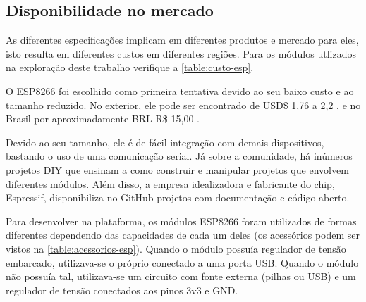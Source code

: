 \FloatBarrier
\subsection{Disponibilidade no mercado}
\label{subsec:mercado-esp}

As diferentes especificações implicam em diferentes produtos e mercado para
eles, isto resulta em diferentes custos em diferentes regiões. Para os módulos
utlizados na exploração deste trabalho verifique a \autoref{table:custo-esp}.

O ESP8266 foi escolhido como primeira tentativa devido ao seu baixo custo e ao
tamanho reduzido. No exterior, ele pode ser encontrado de USD\$ 1,76 a 2,2
\cite{AlibabaESP}, e no Brasil por aproximadamente BRL R\$ 15,00 \cite{mercadolivreEsp}.

\begin{table}[htb]
\end{table}

Devido ao seu tamanho, ele é de fácil integração com demais dispositivos,
bastando o uso de uma comunicação serial. Já sobre a comunidade, há inúmeros
projetos DIY que ensinam a como construir e manipular projetos que envolvem diferentes
módulos. Além disso, a empresa  idealizadora e fabricante do chip, Espressif,
disponibiliza no GitHub projetos com documentação e código aberto.

Para desenvolver na plataforma, os módulos ESP8266 foram utilizados de formas
diferentes dependendo das capacidades de cada um deles (os acessórios podem ser
vistos na \autoref{table:acessorios-esp}). Quando o módulo possuía regulador de
tensão embarcado, utilizava-se o próprio conectado a uma porta USB. Quando o
módulo não possuía tal, utilizava-se um circuito com fonte externa (pilhas ou
USB) e um regulador de tensão conectados aos pinos 3v3 e GND.


